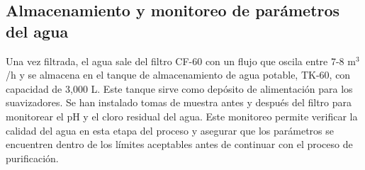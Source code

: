 \subsection{Almacenamiento y monitoreo de parámetros del agua}

Una vez filtrada, el agua sale del filtro CF-60 con un flujo que oscila entre 7-8 m$^3$/h y se almacena en el tanque de almacenamiento de agua potable,
TK-60, con capacidad de 3,000 L. Este tanque sirve como depósito de alimentación para los suavizadores. Se han instalado tomas de muestra antes y
después del filtro para monitorear el pH y el cloro residual del agua. Este monitoreo permite verificar la calidad del agua en esta etapa del proceso y
asegurar que los parámetros se encuentren dentro de los límites aceptables antes de continuar con el proceso de purificación.




